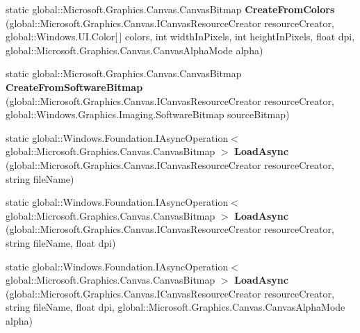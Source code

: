 \begin{DoxyCompactItemize}
static global\+::\+Microsoft.\+Graphics.\+Canvas.\+Canvas\+Bitmap {\bfseries Create\+From\+Colors} (global\+::\+Microsoft.\+Graphics.\+Canvas.\+I\+Canvas\+Resource\+Creator resource\+Creator, global\+::\+Windows.\+U\+I.\+Color\mbox{[}$\,$\mbox{]} colors, int width\+In\+Pixels, int height\+In\+Pixels, float dpi, global\+::\+Microsoft.\+Graphics.\+Canvas.\+Canvas\+Alpha\+Mode alpha)
\item 
\mbox{\label{class_microsoft_1_1_graphics_1_1_canvas_1_1_canvas_bitmap_afcc3780c1206b46f43b6c56426ce3240}} 
static global\+::\+Microsoft.\+Graphics.\+Canvas.\+Canvas\+Bitmap {\bfseries Create\+From\+Software\+Bitmap} (global\+::\+Microsoft.\+Graphics.\+Canvas.\+I\+Canvas\+Resource\+Creator resource\+Creator, global\+::\+Windows.\+Graphics.\+Imaging.\+Software\+Bitmap source\+Bitmap)
\item 
\mbox{\label{class_microsoft_1_1_graphics_1_1_canvas_1_1_canvas_bitmap_ac19e32a381114faa58a2ff1012d712e0}} 
static global\+::\+Windows.\+Foundation.\+I\+Async\+Operation$<$ global\+::\+Microsoft.\+Graphics.\+Canvas.\+Canvas\+Bitmap $>$ {\bfseries Load\+Async} (global\+::\+Microsoft.\+Graphics.\+Canvas.\+I\+Canvas\+Resource\+Creator resource\+Creator, string file\+Name)
\item 
\mbox{\label{class_microsoft_1_1_graphics_1_1_canvas_1_1_canvas_bitmap_ab43fae45180aa4d2fad4cd9b9426416e}} 
static global\+::\+Windows.\+Foundation.\+I\+Async\+Operation$<$ global\+::\+Microsoft.\+Graphics.\+Canvas.\+Canvas\+Bitmap $>$ {\bfseries Load\+Async} (global\+::\+Microsoft.\+Graphics.\+Canvas.\+I\+Canvas\+Resource\+Creator resource\+Creator, string file\+Name, float dpi)
\item 
\mbox{\label{class_microsoft_1_1_graphics_1_1_canvas_1_1_canvas_bitmap_afef79684594ac3ba07cf8cf01939165c}} 
static global\+::\+Windows.\+Foundation.\+I\+Async\+Operation$<$ global\+::\+Microsoft.\+Graphics.\+Canvas.\+Canvas\+Bitmap $>$ {\bfseries Load\+Async} (global\+::\+Microsoft.\+Graphics.\+Canvas.\+I\+Canvas\+Resource\+Creator resource\+Creator, string file\+Name, float dpi, global\+::\+Microsoft.\+Graphics.\+Canvas.\+Canvas\+Alpha\+Mode alpha)
\item 

\end{DoxyCompactItemize}

